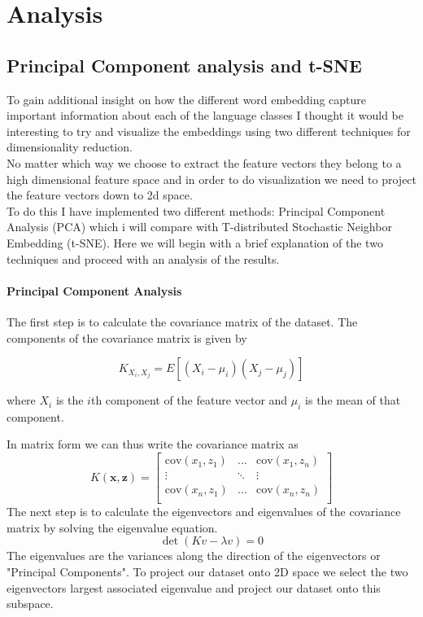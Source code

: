 \section{Analysis}

\subsection{Principal Component analysis and t-SNE}
To gain additional insight on how the different word embedding capture important information about each of the language classes I thought it would be interesting to try and visualize the embeddings using two different techniques for dimensionality reduction.\\

No matter which way we choose to extract the feature vectors they belong to a high dimensional feature space and in order to do visualization we need to project the feature vectors down to 2d space.\\

To do this I have implemented two different methods: Principal Component Analysis (PCA) which i will compare with T-distributed Stochastic Neighbor Embedding (t-SNE).
Here we will begin with a brief explanation of the two techniques and proceed with an analysis of the results.

\paragraph{Principal Component Analysis}

The first step is to calculate the covariance matrix of the dataset.
The components of the covariance matrix is given by

\begin{equation}
K_{X_i,X_j} = E[(X_i - \mu_i )(X_j -  \mu_j)]
\end{equation}

where $X_{i}$ is the $i$th component of the feature vector and $\mu_{i}$ is the mean of that component.

In matrix form we can thus write the covariance matrix as
\begin{equation}
K(\mathbf{x},\mathbf{z}) =
\begin{bmatrix}
    \text{cov}(x_1,z_1) &  \dots  & \text{cov}(x_1,z_n) \\
    \vdots & \ddots     & \vdots \\
    \text{cov}(x_n,z_1) & \dots  & \text{cov}(x_n,z_n) \\
\end{bmatrix}
\end{equation}
The next step is to calculate the eigenvectors and eigenvalues of the covariance matrix by solving the eigenvalue equation.
\begin{equation}
\det (K v-\lambda v) = 0
\end{equation}
The eigenvalues are the variances along the direction of the eigenvectors or "Principal Components". To project our dataset onto 2D space we select the two eigenvectors largest associated eigenvalue and project our dataset onto this subspace.\\

